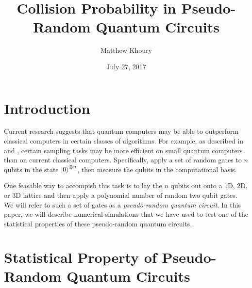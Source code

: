 \message{ !name(report_1.tex)}\documentclass[11pt]{article}
\theoremstyle{definition}
\theoremstyle{plain}
\begin{document}


\title{\bf Collision Probability in Pseudo-Random Quantum Circuits}
\date{July 27, 2017}
\author{Matthew Khoury} 
\maketitle

\noindent\makebox[\linewidth]{\rule{\textwidth}{1pt}} 


  

\section{Introduction}
Current research suggests that quantum computers may be able to outperform classical computers in certain classes of algorithms. For example, as described in {\cite{supremacy_1}} and {\cite{supremacy_2}}, certain sampling tasks may be more efficient on small quantum computers than on current classical computers. Specifically, apply a set of random gates to $n$ qubits in the state $\ket{0}^{\otimes n}$, then measure the qubits in the computational basis.

One feasable way to accompish this task is to lay the $n$ qubits out onto a 1D, 2D, or 3D lattice and then apply a polynomial number of random two qubit gates. We will refer to such a set of gates as a \emph{pseudo-random quantum circuit}. In this paper, we will describe numerical simulations that we have used to test one of the statistical properties of these pseudo-random quantum circuits. 


\section{Statistical Property of Pseudo-Random Quantum Circuits}
\end{document}
